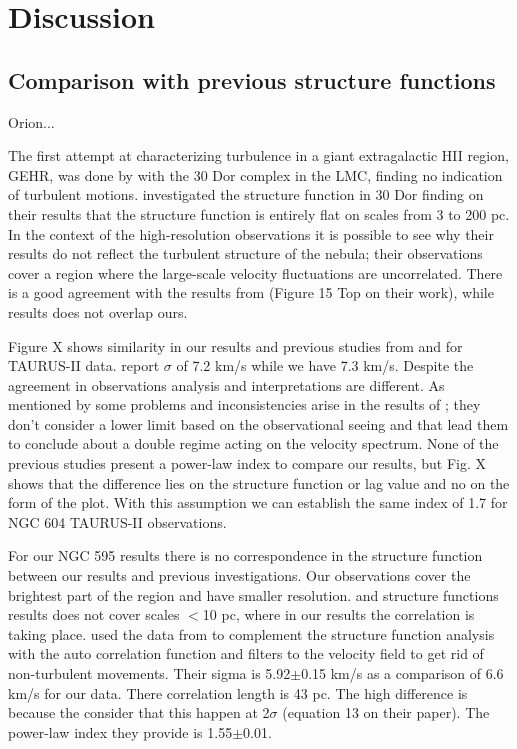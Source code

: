 \documentclass[fleqn,usenatbib, useAMS, a4paper]{mnras}
\begin{document}

\section{Discussion}\label{sec:discussion}

\subsection{Comparison with previous structure functions}

Orion...

The first attempt at characterizing turbulence in a giant extragalactic HII region, GEHR, was done by \citet{1961MNRAS.122....1F} with the 30 Dor complex in the LMC, finding no indication of turbulent motions.
\citet{2019arXiv191203543M} investigated the structure function in 30 Dor finding on their results that the structure function is entirely flat on scales from 3 to 200 pc.
In the context of the high-resolution observations it is possible to see why their results do not reflect the turbulent structure of the nebula; their observations cover a region where the large-scale velocity fluctuations are uncorrelated.
There is a good agreement with the results from \citet{2019arXiv191203543M} (Figure 15 Top on their work), while \citet{1961MNRAS.122....1F} results does not overlap ours.

Figure X shows similarity in our results and previous studies from \citet{tanco1997} and \citet{2019arXiv191203543M} for TAURUS-II data.
\citep{2019arXiv191203543M} report $\sigma$ of 7.2 km/s while we have 7.3 km/s.
Despite the agreement in observations analysis and interpretations are different.
As mentioned by \citet{2019arXiv191203543M} some problems and inconsistencies arise in the results of \citet{tanco1997}; they don't consider a lower limit based on the observational seeing and that lead them to conclude about a double regime acting on the velocity spectrum.
None of the previous studies present a power-law index to compare our results, but Fig. X shows that the difference lies on the structure function or lag value and no on the form of the plot.
With this assumption we can establish the same index of 1.7 for NGC 604 TAURUS-II observations.

For our NGC 595 results there is no correspondence in the structure function between our results and previous investigations.
Our observations cover the brightest part of the region and have smaller resolution.
\citet{lagrois2009multi} and \citet{lagrois2011} structure functions results does not cover scales $<$10 pc, where in our results the correlation is taking place.
\citet{lagrois2011} used the data from \citet{lagrois2009multi} to complement the structure function analysis with the auto correlation function and filters to the velocity field to get rid of non-turbulent movements.
Their sigma is 5.92$\pm$0.15 km/s as a comparison of 6.6 km/s for our data.
There correlation length is 43 pc.
The high difference is because the consider that this happen at 2$\sigma$ (equation 13 on their paper).
The power-law index they provide is 1.55$\pm$0.01.
\end{document}
